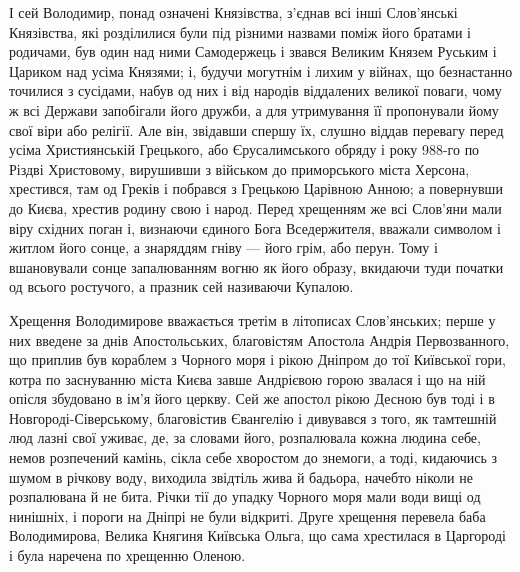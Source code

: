 І сей Володимир, понад означені Князівства, з'єднав всі інші Слов'янські
Князівства, які розділилися були під різними назвами поміж його братами і
родичами, був один над ними Самодержець і звався Великим Князем Руським і
Цариком над усіма Князями; і, будучи могутнім і лихим у війнах, що безнастанно
точилися з сусідами, набув од них і від народів віддалених великої поваги, чому
ж всі Держави запобігали його дружби, а для утримування її пропонували йому
свої віри або релігії. Але він, звідавши спершу їх, слушно віддав перевагу
перед усіма Християнській Грецького, або Єрусалимського обряду і року 988-го по
Різдві Христовому, вирушивши з військом до приморського міста Херсона,
хрестився, там од Греків і побрався з Грецькою Царівною Анною; а повернувши до
Києва, хрестив родину свою і народ. Перед хрещенням же всі Слов'яни мали віру
східних поган і, визнаючи єдиного Бога Вседержителя, вважали символом і житлом
його сонце, а знаряддям гніву — його грім, або перун. Тому і вшановували сонце
запалюванням вогню як його образу, вкидаючи туди початки од всього ростучого, а
празник сей називаючи Купалою.

Хрещення Володимирове вважається третім в літописах Слов'янських; перше у них
введене за днів Апостольських, благовістям Апостола Андрія Первозванного, що
приплив був кораблем з Чорного моря і рікою Дніпром до тої Київської гори,
котра по заснуванню міста Києва завше Андрієвою горою звалася і що на ній
опісля збудовано в ім'я його церкву.  Сей же апостол рікою Десною був тоді і в
Новгороді-Сіверському, благовістив Євангелію і дивувався з того, як тамтешній
люд лазні свої уживає, де, за словами його, розпалювала кожна людина себе,
немов розпечений камінь, сікла себе хворостом до знемоги, а тоді, кидаючись з
шумом в річкову воду, виходила звідтіль жива й бадьора, начебто ніколи не
розпалювана й не бита. Річки тії до упадку Чорного моря мали води вищі од
нинішніх, і пороги на Дніпрі не були відкриті. Друге хрещення перевела баба
Володимирова, Велика Княгиня Київська Ольга, що сама хрестилася в Царгороді і
була наречена по хрещенню Оленою.


